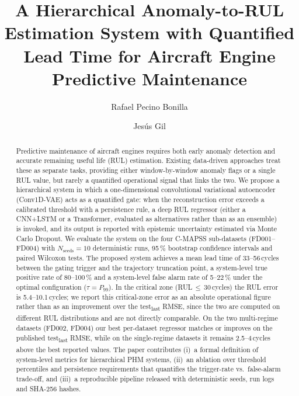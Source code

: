 \documentclass[5p,times,authoryear]{elsarticle}
\begin{document}
\begin{frontmatter}

\title{A Hierarchical Anomaly-to-RUL Estimation System with Quantified Lead Time for Aircraft Engine Predictive Maintenance}

\author[aff1]{Rafael Pecino Bonilla}

\author[aff1]{Jes\'us Gil}



\begin{abstract}
Predictive maintenance of aircraft engines requires both early anomaly detection and accurate remaining useful life (RUL) estimation. Existing data-driven approaches treat these as separate tasks, providing either window-by-window anomaly flags or a single RUL value, but rarely a quantified operational signal that links the two. We propose a hierarchical system in which a one-dimensional convolutional variational autoencoder (Conv1D-VAE) acts as a quantified gate: when the reconstruction error exceeds a calibrated threshold with a persistence rule, a deep RUL regressor (either a CNN+LSTM or a Transformer, evaluated as alternatives rather than as an ensemble) is invoked, and its output is reported with epistemic uncertainty estimated via Monte Carlo Dropout. We evaluate the system on the four C-MAPSS sub-datasets (FD001--FD004) with $N_{\mathrm{seeds}}=10$ deterministic runs, 95\,\% bootstrap confidence intervals and paired Wilcoxon tests. The proposed system achieves a mean lead time of 33--56\,cycles between the gating trigger and the trajectory truncation point, a system-level true positive rate of 80--100\,\% and a system-level false alarm rate of 5--22\,\% under the optimal configuration ($\tau{=}P_{99}$). In the critical zone (RUL\,$\le$\,30\,cycles) the RUL error is 5.4--10.1\,cycles; we report this critical-zone error as an absolute operational figure rather than as an improvement over the test\textsubscript{last} RMSE, since the two are computed on different RUL distributions and are not directly comparable. On the two multi-regime datasets (FD002, FD004) our best per-dataset regressor matches or improves on the published test\textsubscript{last} RMSE, while on the single-regime datasets it remains 2.5--4\,cycles above the best reported values. The paper contributes (i)~a formal definition of system-level metrics for hierarchical PHM systems, (ii)~an ablation over threshold percentiles and persistence requirements that quantifies the trigger-rate vs.\ false-alarm trade-off, and (iii)~a reproducible pipeline released with deterministic seeds, run logs and SHA-256 hashes.
\end{abstract}


\end{frontmatter}
\end{document}
